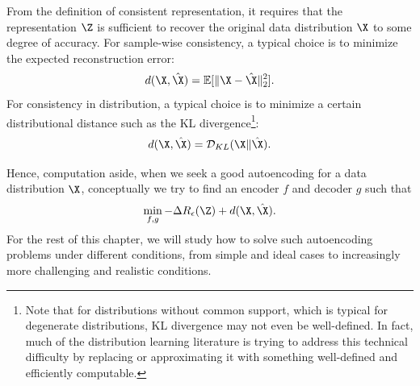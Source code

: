 \documentclass[../../book-main.tex]{subfiles}
\begin{document}
From the definition of consistent representation, it requires that
the representation $\Z$ is sufficient to recover the original data
distribution $\X$ to some degree of accuracy. For sample-wise
consistency, a typical choice is to minimize the expected reconstruction error:
\begin{equation}
  d(\X, \hat \X) = \mathbb{E}[\|\X - \hat\X\|_2^2].
\end{equation}
For consistency in distribution, a typical choice is to minimize a
certain distributional distance such as the KL
divergence\footnote{Note that for distributions without common
  support, which is typical for degenerate distributions, KL divergence
  may not even be well-defined. In fact, much of the distribution
  learning literature is trying to address this technical difficulty by
  replacing or approximating it with something well-defined and
efficiently computable.}:
\begin{equation}
  d(\X, \hat \X) = \mathcal{D}_{KL}(\X\|\hat\X).
\end{equation}

Hence, computation aside, when we seek a good autoencoding for a data
distribution $\X$,  conceptually we try to find an encoder $f$ and
decoder $g$ such that
\begin{equation}
  \min_{f, g} - \Delta R_{\epsilon}(\Z) + d(\X, \hat \X).
  \label{eqn:autoencode-objective-ch5}
\end{equation}
For the rest of this chapter, we will study how to solve such
autoencoding problems under different conditions, from simple and
ideal cases to increasingly more challenging and realistic conditions.

\end{document}
